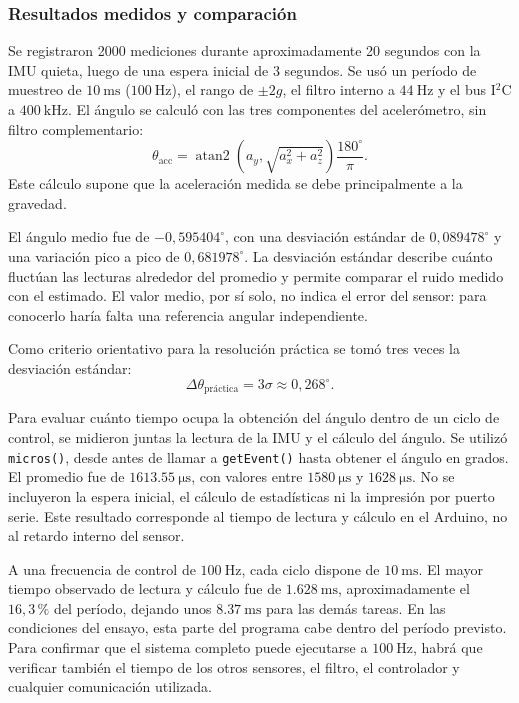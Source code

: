 \documentclass[a4paper, twoside, 10pt, spanish]{article}
\numberwithin{table}{section}
\begin{document}
\subsubsection{Resultados medidos y comparación}

Se registraron 2000 mediciones durante aproximadamente 20 segundos con la IMU quieta, luego de una espera inicial de 3 segundos. Se usó un período de muestreo de $\SI{10}{\milli\second}$ ($\SI{100}{\hertz}$), el rango de $\pm2g$, el filtro interno a $\SI{44}{\hertz}$ y el bus I$^2$C a $\SI{400}{\kilo\hertz}$. El ángulo se calculó con las tres componentes del acelerómetro, sin filtro complementario:
\begin{equation*}
    \theta_{\mathrm{acc}} = \operatorname{atan2}\!\left(a_y,\sqrt{a_x^2+a_z^2}\right)\frac{180^\circ}{\pi}.
\end{equation*}
Este cálculo supone que la aceleración medida se debe principalmente a la gravedad.

El ángulo medio fue de $-0{,}595404^\circ$, con una desviación estándar de $0{,}089478^\circ$ y una variación pico a pico de $0{,}681978^\circ$. La desviación estándar describe cuánto fluctúan las lecturas alrededor del promedio y permite comparar el ruido medido con el estimado. El valor medio, por sí solo, no indica el error del sensor: para conocerlo haría falta una referencia angular independiente.

Como criterio orientativo para la resolución práctica se tomó tres veces la desviación estándar:
\begin{equation*}
    \Delta\theta_{\text{práctica}} = 3\sigma \approx 0{,}268^\circ.
\end{equation*}


Para evaluar cuánto tiempo ocupa la obtención del ángulo dentro de un ciclo de control, se midieron juntas la lectura de la IMU y el cálculo del ángulo. Se utilizó \texttt{micros()}, desde antes de llamar a \texttt{getEvent()} hasta obtener el ángulo en grados. El promedio fue de $\SI{1613,55}{\micro\second}$, con valores entre $\SI{1580}{\micro\second}$ y $\SI{1628}{\micro\second}$. No se incluyeron la espera inicial, el cálculo de estadísticas ni la impresión por puerto serie. Este resultado corresponde al tiempo de lectura y cálculo en el Arduino, no al retardo interno del sensor.

A una frecuencia de control de $\SI{100}{\hertz}$, cada ciclo dispone de $\SI{10}{\milli\second}$. El mayor tiempo observado de lectura y cálculo fue de $\SI{1,628}{\milli\second}$, aproximadamente el $16{,}3\,\%$ del período, dejando unos $\SI{8,37}{\milli\second}$ para las demás tareas. En las condiciones del ensayo, esta parte del programa cabe dentro del período previsto. Para confirmar que el sistema completo puede ejecutarse a $\SI{100}{\hertz}$, habrá que verificar también el tiempo de los otros sensores, el filtro, el controlador y cualquier comunicación utilizada.
\end{document}
